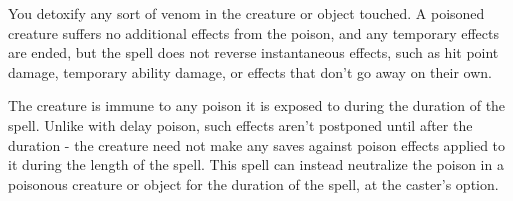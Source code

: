 \begin{spelleffect}
You detoxify any sort of venom in the creature or object touched. A poisoned  creature suffers no additional effects from  the poison, and any temporary effects are ended, but the spell does not reverse  instantaneous effects, such as hit point  damage, temporary ability damage, or  effects that don't go away on their own.
\par The creature is immune to any poison it  is exposed to during the duration of the  spell. Unlike with delay poison, such effects aren't postponed until after the duration - the creature need not make any saves  against poison effects applied to it during  the length of the spell. This spell can instead neutralize the  poison in a poisonous creature or object  for the duration of the spell, at the caster's  option.
\end{spelleffect}

